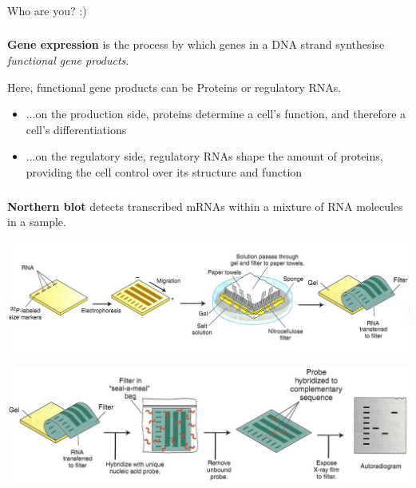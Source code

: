 \documentclass[x11names, svgnames]{beamer}
\begin{document}
\begin{frame}
  \frametitle{\one}
  \begin{center}
    Who are you? :)
  \end{center}
\end{frame}



%
%
%
\begin{frame}
  \frametitle{\two}
  \parbox{\linewidth}{\textbf{Gene expression} is the process by which genes in a DNA strand synthesise \textit{functional gene products}.\newline}
  \parbox{\linewidth}{Here, functional gene products can be Proteins or regulatory RNAs.\newline}
  \begin{itemize}
    \itemsep1em
    \item ...on the production side, proteins determine a cell's function, and therefore a cell's differentiations
    \item ...on the regulatory side, regulatory RNAs shape the amount of proteins, providing the cell control over its structure and function
  \end{itemize}
\end{frame}



%
%
%
\begin{frame}
  \frametitle{\three}
  \textbf{Northern blot} detects transcribed mRNAs within a mixture of RNA molecules in a sample.
  \begin{center}
    \vspace{-1.0em}
    \includegraphics[scale=0.28]{images/wiki_northern_blot_1}
  \end{center}
  \begin{center}
    \vspace{-1.0em}
    \includegraphics[scale=0.28]{images/wiki_northern_blot_2}
  \end{center}
\end{frame}
\end{document}
